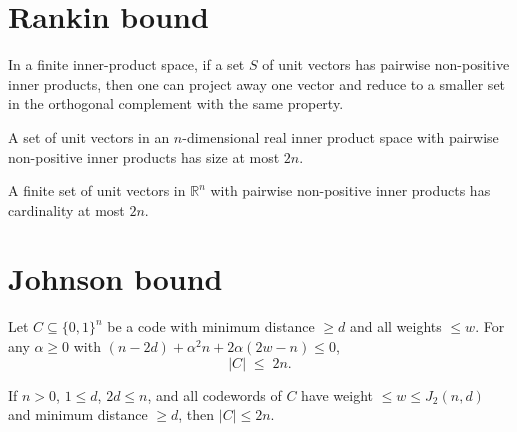 \section{Rankin bound}

\begin{lemma}
\notready
In a finite inner-product space, if a set $S$ of unit vectors has pairwise
non-positive inner products, then one can project away one vector and
reduce to a smaller set in the orthogonal complement with the same property.
\end{lemma}

\begin{theorem}
\notready
{}
A set of unit vectors in an $n$-dimensional real inner product space
with pairwise non-positive inner products has size at most $2n$.
\end{theorem}

\begin{corollary}
\leanok
{}
A finite set of unit vectors in $\mathbb{R}^n$ with pairwise non-positive inner
products has cardinality at most $2n$.
\end{corollary}

\section{Johnson bound}

\begin{theorem}
\leanok
{}
Let $C \subseteq \{0,1\}^n$ be a code with minimum distance $\ge d$ and all
weights $\le w$.  For any $\alpha \ge 0$ with
$(n-2d) + \alpha^2 n + 2\alpha(2w-n) \le 0$,
\[
|C| \;\le\; 2n.
\]
\end{theorem}

\begin{theorem}
\leanok
{}
If $n > 0$, $1 \le d$, $2d \le n$, and all codewords of $C$ have weight $\le w \le J_2(n,d)$
and minimum distance $\ge d$, then $|C| \le 2n$.
\end{theorem}

